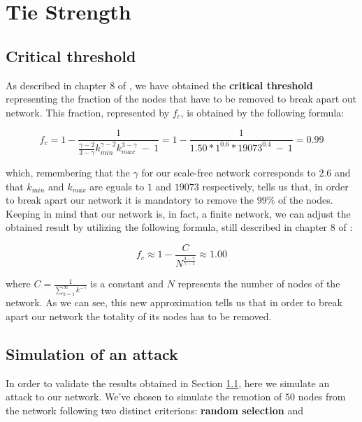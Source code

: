 \chapter{Tie Strength} %
\label{cha:tie_strength}
    \section{Critical threshold} %
    \label{sec:critical_threshold}
        As described in chapter 8 of \cite{network_science}, we have obtained the \textbf{critical threshold}
        representing the fraction of the nodes that have to be removed to break apart out network. This fraction,
        represented by $f_c$, is obtained by the following formula:

        \begin{equation*}
            f_c = 1 - \frac{1}
            {\frac{\gamma - 2}{3 - \gamma}k^{\gamma - 2}_{\mathit{min}}k^{3 - \gamma}_{\mathit{max}} \ - \  1} =
            1 - \frac{1}{1.50 * 1^{0.6} * 19073^{0.4} \ - \ 1} = 0.99
        \end{equation*}

        which, remembering that the $\gamma$ for our scale-free network corresponds to $2.6$ and that
        $k_{\mathit{min}}$ and $k_{\mathit{max}}$ are eguals to $1$ and $19073$ respectively, tells us that, in
        order to break apart our network it is mandatory to remove the $99\%$ of the nodes. Keeping in mind that
        our network is, in fact, a finite network, we can adjust the obtained result by utilizing the following
        formula, still described in chapter 8 of \cite{network_science}:

        \begin{equation*}
            f_c \approx 1 - \frac{C}{N^{\frac{3 - \gamma}{\gamma - 1}}} \approx 1.00
        \end{equation*}

        where $C = \frac{1}{\sum_{k=1}^{\infty}k^{-\gamma}}$ is a constant and $N$ represents the number of nodes
        of the network. As we can see, this new approximation tells us that in order to break apart our network the
        totality of its nodes has to be removed.
    \section{Simulation of an attack} %
    \label{sec:simulation_of_an_attack}
        In order to validate the results obtained in Section \ref{sec:critical_threshold}, here we simulate an
        attack to our network. We've chosen to simulate the remotion of $50$ nodes from the network following two
        distinct criterions: \textbf{random selection} and \textbf{}
